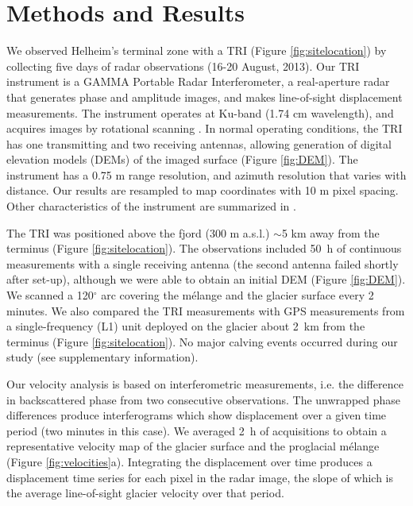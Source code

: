 \documentclass[review]{igs}
\begin{document}
\section{Methods and Results}
We observed Helheim's terminal zone with a TRI (Figure \ref{fig:sitelocation}) by collecting five days of radar observations (16-20 August, 2013). Our TRI instrument is a GAMMA Portable Radar Interferometer, a real-aperture radar that generates phase and amplitude images, and makes line-of-sight displacement measurements. The instrument operates at Ku-band (1.74 cm wavelength), and acquires images by rotational scanning \citep{werner2008gamma}. In normal operating conditions, the TRI has one transmitting and two receiving antennas, allowing generation of digital elevation models (DEMs) of the imaged surface (Figure \ref{fig:DEM}). The instrument has a 0.75 m range resolution, and azimuth resolution that varies with distance. Our results are resampled to map coordinates with 10 m pixel spacing. Other characteristics of the instrument are summarized in \citet{voytenko2014}.


The TRI was positioned above the fjord (300 m a.s.l.) $\sim$5 km away from the terminus (Figure \ref{fig:sitelocation}).  The observations included 50~h of continuous measurements with a single receiving antenna (the second antenna failed shortly after set-up), although we were able to obtain an initial DEM (Figure \ref{fig:DEM}). We scanned a 120$^{\circ}$ arc covering the m\'elange and the glacier surface every 2 minutes. We also compared the TRI measurements with GPS measurements from a single-frequency (L1) unit deployed on the glacier about 2~km from the terminus (Figure \ref{fig:sitelocation}).  
No major calving events occurred during our study (see supplementary information). 


Our velocity analysis is based on interferometric measurements, i.e. the difference in backscattered phase from two consecutive observations.  The unwrapped phase differences produce interferograms which show displacement over a given time period (two minutes in this case). We averaged 2~h of acquisitions to obtain a representative velocity map of the glacier surface and the proglacial m\'elange  (Figure \ref{fig:velocities}a).  Integrating the displacement over time produces a displacement time series for each pixel in the radar image, the slope of which is the average line-of-sight glacier velocity over that period. 
\end{document}
